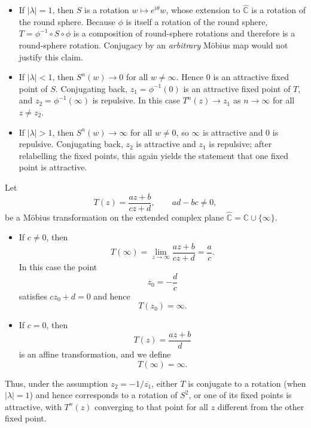 \begin{solution}
\begin{itemize}
	\item If $|\lambda|=1$, then $S$ is a rotation $w\mapsto e^{i\theta}w$,
	whose extension to $\widehat{\mathbb{C}}$ is a rotation of the
	round sphere.  Because $\phi$ is itself a rotation of the round sphere,
	$T=\phi^{-1}\circ S\circ\phi$ is a composition of round-sphere
	rotations and therefore is a round-sphere rotation.  Conjugacy
	by an \emph{arbitrary} M\"obius map would not justify this claim.
	\item If $|\lambda|<1$, then $S^{n}(w)\to 0$ for all $w\neq\infty$.  Hence
	$0$ is an attractive fixed point of $S$.  Conjugating back,
	$z_{1}=\phi^{-1}(0)$ is an attractive fixed point of $T$, and
	$z_{2}=\phi^{-1}(\infty)$ is repulsive.  In this case
	$T^{n}(z)\to z_{1}$ as $n\to\infty$ for all $z\neq z_{2}$.
	\item If $|\lambda|>1$, then $S^{n}(w)\to\infty$ for all $w\neq 0$, so
	$\infty$ is attractive and $0$ is repulsive.  Conjugating back,
	$z_{2}$ is attractive and $z_{1}$ is repulsive; after relabelling
	the fixed points, this again yields the statement that one fixed
	point is attractive.
\end{itemize}


Let
\[
T(z) = \frac{az+b}{cz+d}, \qquad ad-bc \neq 0,
\]
be a M\"obius transformation on the extended complex plane
\(\widehat{\mathbb{C}} = \mathbb{C}\cup\{\infty\}\).

\begin{itemize}
	\item If \(c \neq 0\), then
	\[
	T(\infty)
	= \lim_{z\to\infty} \frac{az+b}{cz+d}
	= \frac{a}{c}.
	\]
	In this case the point
	\[
	z_{0} = -\frac{d}{c}
	\]
	satisfies \(cz_{0}+d=0\) and hence
	\[
	T(z_{0}) = \infty.
	\]
	
	\item If \(c = 0\), then
	\[
	T(z) = \frac{az+b}{d}
	\]
	is an affine transformation, and we define
	\[
	T(\infty) = \infty.
	\]
\end{itemize}


Thus, under the assumption $z_{2}=-1/\overline{z_{1}}$, either $T$ is
conjugate to a rotation (when $|\lambda|=1$) and hence corresponds to a
rotation of $S^{2}$, or one of its fixed points is attractive, with
$T^{n}(z)$ converging to that point for all $z$ different from the other
fixed point.






\end{solution}
